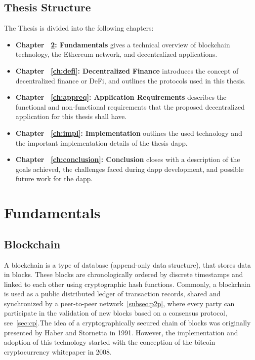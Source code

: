 \documentclass[11pt,a4paper]{report}
\begin{document}
\section{Thesis Structure}
The Thesis is divided into the following chapters:
\begin{itemize}
	
	\item \textbf{Chapter ~\ref{ch:background}: Fundamentals } gives a technical overview of blockchain technology, the Ethereum network, and decentralized applications.
	\item \textbf{Chapter ~\ref{ch:defi}: Decentralized Finance } introduces the concept of decentralized finance or DeFi, and outlines the protocols used in this thesis.
	\item \textbf{Chapter ~\ref{ch:appreq}: Application Requirements} describes the functional and non-functional requirements that the proposed decentralized application for this thesis shall have.
	\item \textbf{Chapter ~\ref{ch:impl}: Implementation} outlines the used technology and the important implementation details of the thesis dapp.
	\item \textbf{Chapter ~\ref{ch:conclusion}: Conclusion} closes with a description of the goals achieved, the challenges faced during dapp development, and possible future work for the dapp.
\end{itemize}


\chapter{Fundamentals} \label{ch:background}

\section{Blockchain} \label{sec:bc}
A blockchain\cite{book:bc}\cite{article:bc} is a type of database (append-only data structure), that stores data in blocks. These blocks are chronologically ordered by discrete timestamps and linked to each other using cryptographic hash functions. Commonly, a blockchain is used as a public distributed ledger of transaction records, shared and synchronized by a peer-to-peer network~\ref{subsec:p2p}, where every party can participate in the validation of new blocks based on a consensus protocol, see~\ref{sec:cp}.The idea of a cryptographically secured chain of blocks was originally presented by Haber and Stornetta\cite{time-stamp} in 1991. However, the implementation and adoption of this technology started with the conception of the bitcoin cryptocurrency whitepaper\cite{bitcoin} in 2008.
\end{document}

